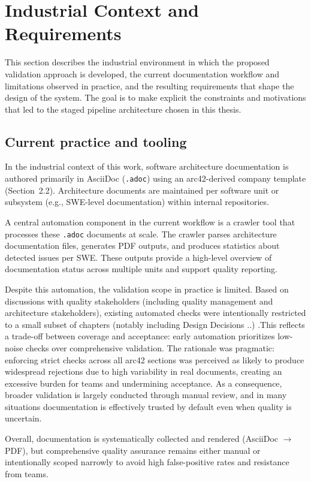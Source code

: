 \section{Industrial Context and Requirements}
This section describes the industrial environment in which the proposed validation approach is developed, the current documentation workflow and limitations observed in practice, and the resulting requirements that shape the design of the system. The goal is to make explicit the constraints and motivations that led to the staged pipeline architecture chosen in this thesis.

\subsection{Current practice and tooling}
In the industrial context of this work, software architecture documentation is authored primarily in AsciiDoc (\texttt{.adoc}) using an arc42-derived company template (Section~2.2). Architecture documents are maintained per software unit or subsystem (e.g., SWE-level documentation) within internal repositories.

A central automation component in the current workflow is a crawler tool that processes these \texttt{.adoc} documents at scale. The crawler parses architecture documentation files, generates PDF outputs, and produces statistics about detected issues per SWE. These outputs provide a high-level overview of documentation status across multiple units and support quality reporting.

Despite this automation, the validation scope in practice is limited. Based on discussions with quality stakeholders (including quality management and architecture stakeholders), existing automated checks were intentionally restricted to a small subset of chapters (notably including Design Decisions ..) .This reflects a trade-off between coverage and acceptance: early automation prioritizes low-noise checks over comprehensive validation. The rationale was pragmatic: enforcing strict checks across all arc42 sections was perceived as likely to produce widespread rejections due to high variability in real documents, creating an excessive burden for teams and undermining acceptance. As a consequence, broader validation is largely conducted through manual review, and in many situations documentation is effectively trusted by default even when quality is uncertain.

Overall, documentation is systematically collected and rendered (AsciiDoc $\rightarrow$ PDF), but comprehensive quality assurance remains either manual or intentionally scoped narrowly to avoid high false-positive rates and resistance from teams.

